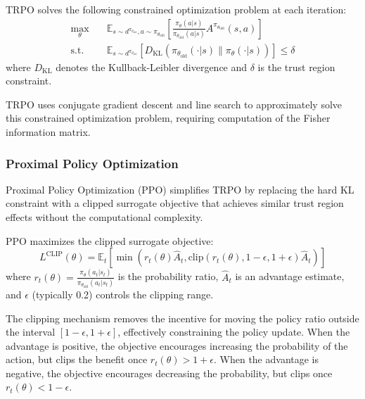 \begin{definition}
\label{def:trpo}
TRPO solves the following constrained optimization problem at each iteration:
\begin{equation}
\begin{aligned}
\max_\theta \quad & \mathbb{E}_{s \sim d^{\pi_{\theta_\text{old}}}, a \sim \pi_{\theta_\text{old}}}\left[\frac{\pi_\theta(a|s)}{\pi_{\theta_\text{old}}(a|s)} A^{\pi_{\theta_\text{old}}}(s,a)\right] \\
\text{s.t.} \quad & \mathbb{E}_{s \sim d^{\pi_{\theta_\text{old}}}}\left[D_\text{KL}(\pi_{\theta_\text{old}}(\cdot|s) \| \pi_\theta(\cdot|s))\right] \leq \delta
\end{aligned}
\end{equation}
where $D_\text{KL}$ denotes the Kullback-Leibler divergence and $\delta$ is the trust region constraint.
\end{definition}

TRPO uses conjugate gradient descent and line search to approximately solve this constrained optimization problem, requiring computation of the Fisher information matrix.

\subsubsection{Proximal Policy Optimization}

Proximal Policy Optimization (PPO) simplifies TRPO by replacing the hard KL constraint with a clipped surrogate objective that achieves similar trust region effects without the computational complexity.

\begin{definition}
\label{def:ppo}
PPO maximizes the clipped surrogate objective:
\begin{equation}
L^\text{CLIP}(\theta) = \mathbb{E}_t\left[\min\left(r_t(\theta) \hat{A}_t, \text{clip}(r_t(\theta), 1-\epsilon, 1+\epsilon) \hat{A}_t\right)\right]
\end{equation}
where $r_t(\theta) = \frac{\pi_\theta(a_t|s_t)}{\pi_{\theta_\text{old}}(a_t|s_t)}$ is the probability ratio, $\hat{A}_t$ is an advantage estimate, and $\epsilon$ (typically 0.2) controls the clipping range.
\end{definition}

The clipping mechanism removes the incentive for moving the policy ratio outside the interval $[1-\epsilon, 1+\epsilon]$, effectively constraining the policy update. When the advantage is positive, the objective encourages increasing the probability of the action, but clips the benefit once $r_t(\theta) > 1+\epsilon$. When the advantage is negative, the objective encourages decreasing the probability, but clips once $r_t(\theta) < 1-\epsilon$.

